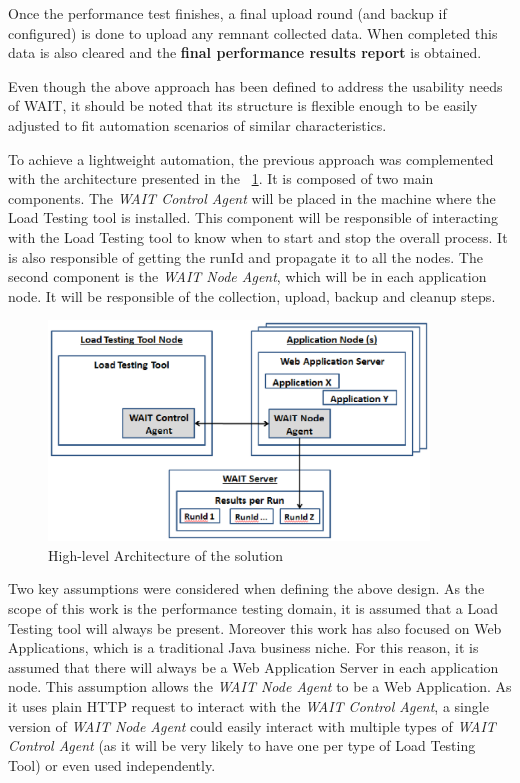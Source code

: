 \documentclass[runningheads,a4paper]{llncs}
\begin{document}
Once the performance test finishes, a final upload round (and backup if
configured) is done to upload any remnant collected data. When completed this
data is also cleared and the \textbf{final performance results report} is
obtained.

Even though the above approach has been defined to address the usability needs
of WAIT, it should be noted that its structure is flexible enough to be easily
adjusted to fit automation scenarios of similar characteristics.

To achieve a lightweight automation, the previous approach was complemented with
the architecture presented in the \figurename ~\ref{fig_Arch}. It is composed of
two main components. The \emph{WAIT Control Agent} will be placed in the machine
where the Load Testing tool is installed. This component will be responsible of
interacting with the Load Testing tool to know when to start and stop the
overall process. It is also responsible of getting the runId and propagate it to
all the nodes. The second component is the \emph{WAIT Node Agent}, which will be
in each application node. It will be responsible of the collection, upload,
backup and cleanup steps.
\vspace{-5pt}
\begin{figure}[!h]
\centering
\includegraphics[totalheight=.3\textheight,width=0.9\textwidth]{architecture_dwait}
\caption{High-level Architecture of the solution}
\label{fig_Arch}
\end{figure}
\vspace{-5pt}
Two key assumptions were considered when defining the above design. As the scope
of this work is the performance testing domain, it is assumed that a Load
Testing tool will always be present. Moreover this work has also focused on Web
Applications, which is a traditional Java business niche. For this reason, it is
assumed that there will always be a Web Application Server in each application
node. This assumption allows the \emph{WAIT Node Agent} to be a Web Application.
As it uses plain HTTP request to interact with the \emph{WAIT Control Agent}, a
single version of \emph{WAIT Node Agent} could easily interact with multiple
types of \emph{WAIT Control Agent} (as it will be very likely to have one per
type of Load Testing Tool) or even used independently.
\end{document}
